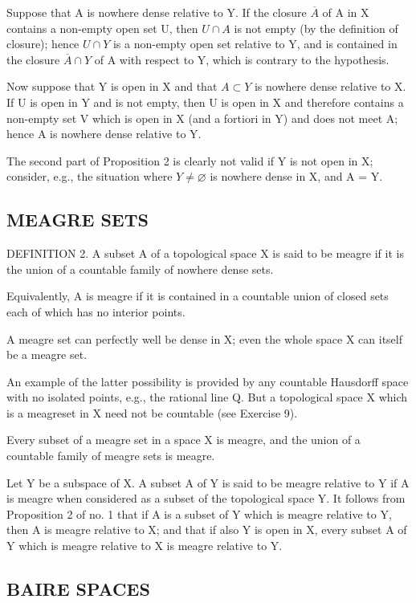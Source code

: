 Suppose that A is nowhere dense relative to Y. If the closure \(\overline{A}\) of A in X contains a non-empty open set U, then \(U \cap A\) is not empty (by the definition of closure); hence \(U \cap Y\) is a non-empty open set relative to Y, and is contained in the closure \(\overline{A} \cap Y\) of A with respect to Y, which is contrary to the hypothesis.

Now suppose that Y is open in X and that \(A \subset Y\) is nowhere dense relative to X. If U is open in Y and is not empty, then U is open in X and therefore contains a non-empty set V which is open in X (and a fortiori in Y) and does not meet A; hence A is nowhere dense relative to Y.

The second part of Proposition 2 is clearly not valid if Y is not open in X; consider, e.g., the situation where \(Y \neq \varnothing\) is nowhere dense in X, and A = Y.

\subsection{MEAGRE SETS}

DEFINITION 2. A subset A of a topological space X is said to be meagre if it is the union of a countable family of nowhere dense sets.

Equivalently, A is meagre if it is contained in a countable union of closed sets each of which has no interior points.

A meagre set can perfectly well be dense in X; even the whole space X can itself be a meagre set.

An example of the latter possibility is provided by any countable Hausdorff space with no isolated points, e.g., the rational line Q. But a topological space X which is a meagreset in X need not be countable (see Exercise 9).

Every subset of a meagre set in a space X is meagre, and the union of a countable family of meagre sets is meagre.

Let Y be a subspace of X. A subset A of Y is said to be meagre relative to Y if A is meagre when considered as a subset of the topological space Y. It follows from Proposition 2 of no. 1 that if A is a subset of Y which is meagre relative to Y, then A is meagre relative to X; and that if also Y is open in X, every subset A of Y which is meagre relative to X is meagre relative to Y.

\subsection{BAIRE SPACES}

